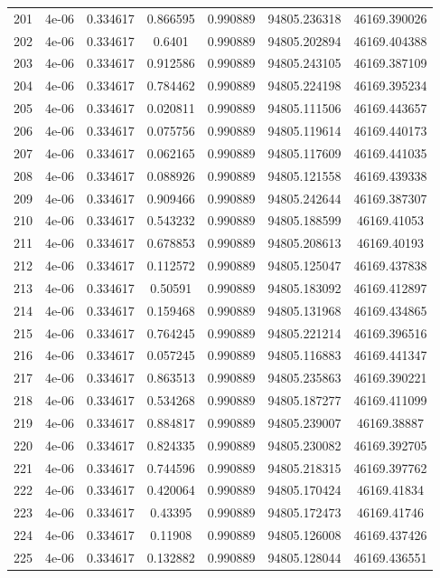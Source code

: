 \begin{table}
\begin{tabular*}{\linewidth}{c|c|c|c|c|c|c}
201 & 4e-06 & 0.334617 & 0.866595 & 0.990889 & 94805.236318 & 46169.390026\\
202 & 4e-06 & 0.334617 & 0.6401 & 0.990889 & 94805.202894 & 46169.404388\\
203 & 4e-06 & 0.334617 & 0.912586 & 0.990889 & 94805.243105 & 46169.387109\\
204 & 4e-06 & 0.334617 & 0.784462 & 0.990889 & 94805.224198 & 46169.395234\\
205 & 4e-06 & 0.334617 & 0.020811 & 0.990889 & 94805.111506 & 46169.443657\\
206 & 4e-06 & 0.334617 & 0.075756 & 0.990889 & 94805.119614 & 46169.440173\\
207 & 4e-06 & 0.334617 & 0.062165 & 0.990889 & 94805.117609 & 46169.441035\\
208 & 4e-06 & 0.334617 & 0.088926 & 0.990889 & 94805.121558 & 46169.439338\\
209 & 4e-06 & 0.334617 & 0.909466 & 0.990889 & 94805.242644 & 46169.387307\\
210 & 4e-06 & 0.334617 & 0.543232 & 0.990889 & 94805.188599 & 46169.41053\\
211 & 4e-06 & 0.334617 & 0.678853 & 0.990889 & 94805.208613 & 46169.40193\\
212 & 4e-06 & 0.334617 & 0.112572 & 0.990889 & 94805.125047 & 46169.437838\\
213 & 4e-06 & 0.334617 & 0.50591 & 0.990889 & 94805.183092 & 46169.412897\\
214 & 4e-06 & 0.334617 & 0.159468 & 0.990889 & 94805.131968 & 46169.434865\\
215 & 4e-06 & 0.334617 & 0.764245 & 0.990889 & 94805.221214 & 46169.396516\\
216 & 4e-06 & 0.334617 & 0.057245 & 0.990889 & 94805.116883 & 46169.441347\\
217 & 4e-06 & 0.334617 & 0.863513 & 0.990889 & 94805.235863 & 46169.390221\\
218 & 4e-06 & 0.334617 & 0.534268 & 0.990889 & 94805.187277 & 46169.411099\\
219 & 4e-06 & 0.334617 & 0.884817 & 0.990889 & 94805.239007 & 46169.38887\\
220 & 4e-06 & 0.334617 & 0.824335 & 0.990889 & 94805.230082 & 46169.392705\\
221 & 4e-06 & 0.334617 & 0.744596 & 0.990889 & 94805.218315 & 46169.397762\\
222 & 4e-06 & 0.334617 & 0.420064 & 0.990889 & 94805.170424 & 46169.41834\\
223 & 4e-06 & 0.334617 & 0.43395 & 0.990889 & 94805.172473 & 46169.41746\\
224 & 4e-06 & 0.334617 & 0.11908 & 0.990889 & 94805.126008 & 46169.437426\\
225 & 4e-06 & 0.334617 & 0.132882 & 0.990889 & 94805.128044 & 46169.436551\\
\end{tabular*}
\end{table}
